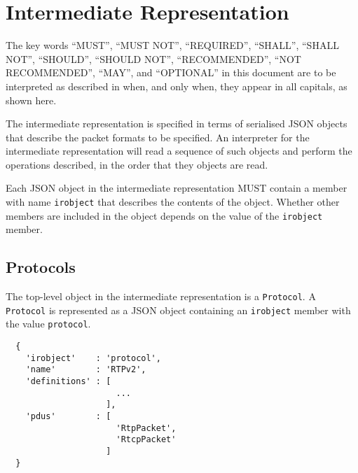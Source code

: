\documentclass[twocolumn,a4paper]{article}
\begin{document}


\section{Intermediate Representation}

The key words ``MUST'', ``MUST NOT'', ``REQUIRED'', ``SHALL'', ``SHALL
NOT'', ``SHOULD'', ``SHOULD NOT'', ``RECOMMENDED'', ``NOT RECOMMENDED'',
``MAY'', and ``OPTIONAL'' in this document are to be interpreted as
described in \cite{RFC2119,RFC8174} when, and only when, they appear
in all capitals, as shown here.



The intermediate representation is specified in terms of serialised JSON
\cite{RFC7159} objects that describe the packet formats to be specified.
An interpreter for the intermediate representation will read a sequence of
such objects and perform the operations described, in the order that they
objects are read.

Each JSON object in the intermediate representation MUST contain a member
with name \texttt{irobject} that describes the contents of the object.
Whether other members are included in the object depends on the value of
the \texttt{irobject} member.

\subsection{Protocols}

The top-level object in the intermediate representation is a
\texttt{Protocol}. A \texttt{Protocol} is represented as a JSON object
containing an \texttt{irobject} member with the value \texttt{protocol}.

\begin{verbatim}
  {
    'irobject'    : 'protocol',
    'name'        : 'RTPv2',
    'definitions' : [
                      ...
                    ],
    'pdus'        : [
                      'RtpPacket',
                      'RtcpPacket'
                    ]
  }
\end{verbatim}
\end{document}
